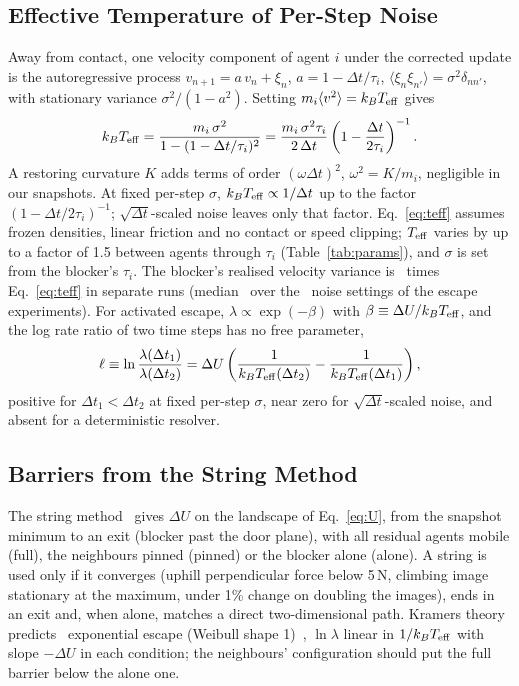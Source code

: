 \subsection{Effective Temperature of Per-Step Noise}\label{sec:teff}
Away from contact, one velocity component of agent $i$ under the corrected update is the autoregressive process $v_{n+1}=a\,v_n+\xi_n$, $a=1-\Delta t/\tau_i$, $\langle\xi_n\xi_{n'}\rangle=\sigma^2\delta_{nn'}$, with stationary variance $\sigma^2/(1-a^2)$. Setting $m_i\langle v^2\rangle=k_BT_{\rm eff}$ gives
\begin{equation}\label{eq:teff}
k_BT_{\rm eff}=\frac{m_i\,\sigma^2}{1-(1-\Delta t/\tau_i)^2}=\frac{m_i\,\sigma^2\tau_i}{2\,\Delta t}\left(1-\frac{\Delta t}{2\tau_i}\right)^{-1}.
\end{equation}
A restoring curvature $K$ adds terms of order $(\omega\Delta t)^2$, $\omega^2=K/m_i$, negligible in our snapshots. At fixed per-step $\sigma$, $k_BT_{\rm eff}\propto1/\Delta t$ up to the factor $(1-\Delta t/2\tau_i)^{-1}$; $\sqrt{\Delta t}$-scaled noise leaves only that factor. Eq.~\eqref{eq:teff} assumes frozen densities, linear friction and no contact or speed clipping; $T_{\rm eff}$ varies by up to a factor of 1.5 between agents through $\tau_i$ (Table~\ref{tab:params}), and $\sigma$ is set from the blocker's $\tau_i$. The blocker's realised velocity variance is \TthreeRatioMean\ times Eq.~\eqref{eq:teff} in separate runs (median \TthreeCellsMedian\ over the \TthreeCells\ noise settings of the escape experiments). For activated escape, $\lambda\propto\exp(-\beta)$ with $\beta\equiv\Delta U/k_BT_{\rm eff}$, and the log rate ratio of two time steps has no free parameter,
\begin{equation}\label{eq:ell}
\ell\equiv\ln\frac{\lambda(\Delta t_1)}{\lambda(\Delta t_2)}=\Delta U\left(\frac{1}{k_BT_{\rm eff}(\Delta t_2)}-\frac{1}{k_BT_{\rm eff}(\Delta t_1)}\right),
\end{equation}
positive for $\Delta t_1<\Delta t_2$ at fixed per-step $\sigma$, near zero for $\sqrt{\Delta t}$-scaled noise, and absent for a deterministic resolver.

\subsection{Barriers from the String Method}\label{sec:barrier}
The string method~\cite{e2007} gives $\Delta U$ on the landscape of Eq.~\eqref{eq:U}, from the snapshot minimum to an exit (blocker past the door plane), with all residual agents mobile (full), the neighbours pinned (pinned) or the blocker alone (alone). A string is used only if it converges (uphill perpendicular force below 5\,N, climbing image stationary at the maximum, under 1\% change on doubling the images), ends in an exit and, when alone, matches a direct two-dimensional path. Kramers theory predicts~\cite{kramers1940,hanggi1990} exponential escape (Weibull shape 1)~\cite{weibull1951}, $\ln\lambda$ linear in $1/k_BT_{\rm eff}$ with slope $-\Delta U$ in each condition; the neighbours' configuration should put the full barrier below the alone one.

